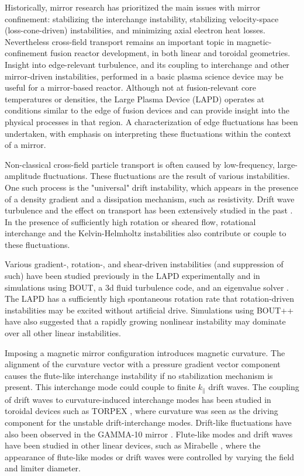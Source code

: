 Historically, mirror research has prioritized the main issues with mirror confinement: stabilizing the interchange instability, stabilizing velocity-space (loss-cone-driven) instabilities, and minimizing axial electron heat losses. Nevertheless cross-field transport remains an important topic in magnetic-confinement fusion reactor development, in both linear and toroidal geometries. Insight into edge-relevant turbulence, and its coupling to interchange and other mirror-driven instabilities, performed in a basic plasma science device may be useful for a mirror-based reactor. Although not at fusion-relevant core temperatures or densities, the Large Plasma Device (LAPD) operates at conditions similar to the edge of fusion devices and can provide insight into the physical processes in that region. 
A characterization of edge fluctuations has been undertaken, with emphasis on interpreting these fluctuations within the context of a mirror. 

Non-classical cross-field particle transport is often caused by low-frequency, large-amplitude fluctuations. These fluctuations are the result of various instabilities. One such process is the "universal" drift instability, which appears in the presence of a density gradient and a dissipation mechanism, such as resistivity. Drift wave turbulence and the effect on transport has been extensively studied in the past \cite{Horton_1999, Tynan_review_2009}. In the presence of sufficiently high rotation or sheared flow, rotational interchange and the Kelvin-Helmholtz instabilities also contribute or couple to these fluctuations. 

Various gradient-, rotation-, and shear-driven instabilities (and suppression of such) have been studied previously in the LAPD experimentally \cite{Schaffner_2012, Schaffner_turbulence_2013, Schaffner_2013} and in simulations using BOUT, a 3d fluid turbulence code, and an eigenvalue solver \cite{Popovich_2010}. The LAPD has a sufficiently high spontaneous rotation rate that rotation-driven instabilities may be excited without artificial drive. Simulations using BOUT++ \cite{Friedman_2013} have also suggested that a rapidly growing nonlinear instability may dominate over all other linear instabilities.

Imposing a magnetic mirror configuration introduces magnetic curvature. The alignment of the curvature vector with a pressure gradient vector component causes the flute-like interchange instability if no stabilization mechanism is present. This interchange mode could couple to finite $k_\parallel$ drift waves. The coupling of drift waves to curvature-induced interchange modes has been studied in toroidal devices such as TORPEX \cite{Poli_experimental_2006, Fasoli_electrostatic_2006}, where curvature was seen as the driving component for the unstable drift-interchange modes. Drift-like fluctuations have also been observed in the GAMMA-10 mirror \cite{Mase_1991, Yoshikawa_2010}. Flute-like modes and drift waves have been studied in other linear devices, such as Mirabelle \cite{Brochard_transition_2005}, where the appearance of flute-like modes or drift waves were controlled by varying the field and limiter diameter. 

